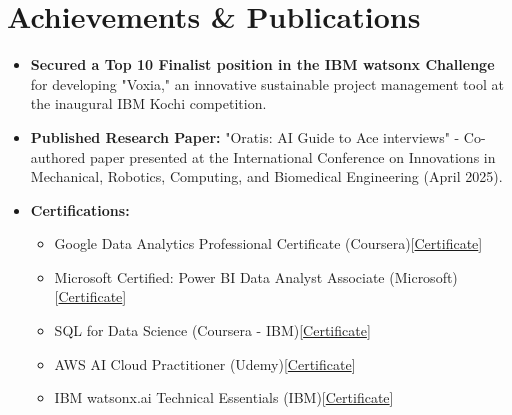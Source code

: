 \documentclass[letterpaper,10pt]{article}
\newcommand{\resumeItem}[1]{\item\small{#1\vspace{-2pt}}}
\newcommand{\resumeSubHeadingListStart}{\begin{itemize}[leftmargin=0.15in, label={}]}
\newcommand{\resumeSubHeadingListEnd}{\end{itemize}}
\newcommand{\resumeItemListStart}{\begin{itemize}[leftmargin=0.15in, itemsep=-3pt, topsep=0pt]}
\newcommand{\resumeItemListEnd}{\end{itemize}\vspace{-5pt}}
\begin{document}
\section{Achievements \& Publications}
\resumeSubHeadingListStart
    \resumeItem{\textbf{Secured a Top 10 Finalist position in the IBM watsonx Challenge} for developing "Voxia," an innovative sustainable project management tool at the inaugural IBM Kochi competition.}
    \resumeItem{\textbf{Published Research Paper:} "Oratis: AI Guide to Ace interviews" - Co-authored paper presented at the International Conference on Innovations in Mechanical, Robotics, Computing, and Biomedical Engineering (April 2025).}
    \resumeItem{\textbf{Certifications:}}
    \resumeItemListStart
        \resumeItem{Google Data Analytics Professional Certificate (Coursera)[\href{https://example.com/google-data-analytics}{Certificate}]}
        \resumeItem{Microsoft Certified: Power BI Data Analyst Associate (Microsoft)[\href{https://example.com/microsoft-powerbi}{Certificate}]}
        \resumeItem{SQL for Data Science (Coursera - IBM)[\href{https://example.com/sql-for-datascience}{Certificate}]}
        \resumeItem{AWS AI Cloud Practitioner (Udemy)[\href{https://drive.google.com/file/d/1hyq1dbVjAA1MLuaTsM54wPWLVKikRFmg/view?usp=sharing}{Certificate}]}
        \resumeItem{IBM watsonx.ai Technical Essentials (IBM)[\href{https://drive.google.com/file/d/1jE_tHyAmTK9e3APr32Q-aovg3wDvVlDL/view?usp=sharing}{Certificate}]}
    \resumeItemListEnd
\resumeSubHeadingListEnd
\end{document}

